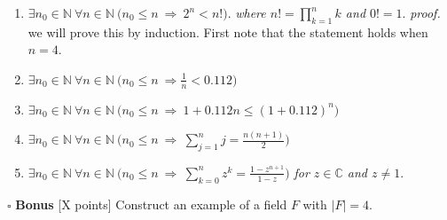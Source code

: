 \documentclass[11pt]{article}
\numberwithin{equation}{section}
\DeclareMathOperator*{\+}{\oplus}
\begin{document}
 \begin{enumerate}[label= 2.\arabic*), itemsep=0.4cm]
  \item %
    $ \exists n_0 \in \mathbb{N} \  \forall n \in \mathbb{N} \ \Big (n_0 \leq n \ \Rightarrow \ 2^n < n! \Big )$. \textit{where $n! = \prod\limits_{k=1}^n k$ and $0!=1$}.
    \textit{proof.} we will prove this by induction. First note that the statement holds when $n=4$. 


  \item %
    $ \exists n_0 \in \mathbb{N} \ \forall n \in \mathbb{N} \ \Big (n_0 \leq n \ \Rightarrow \frac{1}{n} < 0.112 \Big )$

  \item %
    $\exists n_0 \in \mathbb{N} \ \forall n \in \mathbb{N} \ \Big (n_0 \leq n \ \Rightarrow \ 1+0.112n \leq (1+ 0.112)^n \Big )$

  \item %
    $\exists n_0 \in \mathbb{N} \ \forall n \in \mathbb{N} \ \Big (n_0 \leq n \ \Rightarrow \ \sum\limits_{j=1}^n j= \frac{n(n+1)}{2} \Big )$

  \item %
    $\exists n_0 \in \mathbb{N} \ \forall n \in \mathbb{N} \ \Big (n_0 \leq n \ \Rightarrow \ \sum\limits_{k=0}^n z^k = \frac{1-z^{n+1}}{1-z} \Big )$ \textit{for $z \in \mathbb{C}$ and $z \neq 1$}.

\end{enumerate}   

\noindent $\square$ \textbf{Bonus} [X points] Construct an example of a field $F$ with $|F|=4$.

 
\end{document}

